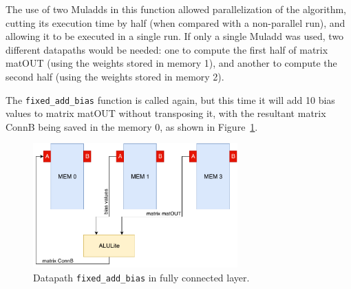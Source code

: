The use of two Muladds in this function allowed parallelization of the
algorithm, cutting its execution time by half (when compared with a non-parallel
run), and allowing it to be executed in a single run. If only a single Muladd
was used, two different datapaths would be needed: one to compute the first half
of matrix matOUT (using the weights stored in memory 1), and another to compute
the second half (using the weights stored in memory 2).

The {\tt fixed\_add\_bias} function is called again, but this time it will
add 10 bias values to matrix matOUT without transposing it, with the resultant
matrix ConnB being saved in the memory 0, as shown in
Figure~\ref{fig:fixed_add_bias_2}.

\begin{figure}[!htb]
	\centering
	\includegraphics[width=0.7\textwidth]{Figures/fixed_add_bias_2.pdf}
	\caption{Datapath {\tt fixed\_add\_bias} in fully connected layer.}
	\label{fig:fixed_add_bias_2}
\end{figure}


